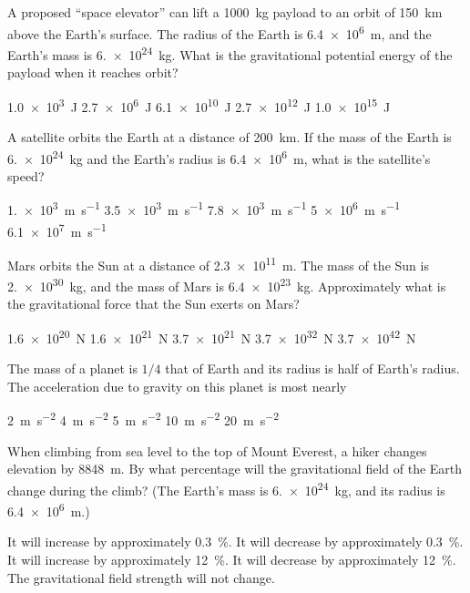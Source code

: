 \documentclass{../../../oss-classkick-exam}
\begin{document}
\begin{multicols*}{2}
\begin{questions}
    \question A proposed ``space elevator'' can lift a \SI{1000}{\kilo\gram}
    payload to an orbit of \SI{150}{\kilo\metre} above the Earth's surface. The
    radius of the Earth is \SI{6.4e6}{\metre}, and the Earth's mass is
    \SI{6.e24}{\kilo\gram}. What is the gravitational potential energy of the
    payload when it reaches orbit?
    \begin{choices}
      \choice\SI{1.0e3}{\joule}
      \choice\SI{2.7e6}{\joule}
      \choice\SI{6.1e10}{\joule}
      \choice\SI{2.7e12}{\joule}
      \choice\SI{1.0e15}{\joule}
    \end{choices}
    
    \question A satellite orbits the Earth at a distance of
    \SI{200}{\kilo\metre}. If the mass of the Earth is \SI{6.e24}{\kilo\gram}
    and the Earth's radius is \SI{6.4e6}{\metre}, what is the satellite's speed?
    \begin{choices}
      \choice\SI{1.e3}{\metre\per\second}
      \choice\SI{3.5e3}{\metre\per\second}
      \choice\SI{7.8e3}{\metre\per\second}
      \choice\SI{5e6}{\metre\per\second}
      \choice\SI{6.1e7}{\metre\per\second}
    \end{choices}
    
    \question Mars orbits the Sun at a distance of \SI{2.3e11}{\metre}. The
    mass of the Sun is \SI{2.e30}{\kilo\gram}, and the mass of Mars is
    \SI{6.4e23}{\kilo\gram}. Approximately what is the gravitational force that
    the Sun exerts on Mars?
    \begin{choices}
      \choice\SI{1.6e20}{\newton}
      \choice\SI{1.6e21}{\newton}
      \choice\SI{3.7e21}{\newton}
      \choice\SI{3.7e32}{\newton}
      \choice\SI{3.7e42}{\newton}
    \end{choices}

    \question The mass of a planet is $1/4$ that of Earth and its radius is
    half of Earth's radius. The acceleration due to gravity on this planet is
    most nearly
    \begin{choices}
      \choice\SI{2}{\metre\per\second\squared}
      \choice\SI{4}{\metre\per\second\squared}
      \choice\SI{5}{\metre\per\second\squared}
      \choice\SI{10}{\metre\per\second\squared}
      \choice\SI{20}{\metre\per\second\squared}
    \end{choices}
    
    \question When climbing from sea level to the top of Mount Everest, a hiker
    changes elevation by \SI{8848}{\metre}. By what percentage will the
    gravitational field of the Earth change during the climb? (The Earth's
    mass is \SI{6.e24}{\kilo\gram}, and its radius is \SI{6.4e6}{\metre}.)
    \begin{choices}
      \choice It will increase by approximately \SI{.3}{\percent}.
      \choice It will decrease by approximately \SI{.3}{\percent}.
      \choice It will increase by approximately \SI{12}{\percent}.
      \choice It will decrease by approximately \SI{12}{\percent}.
      \choice The gravitational field strength will not change.
    \end{choices}
    \vspace{.7in}
    

\end{questions}
\end{multicols*}
\end{document}
